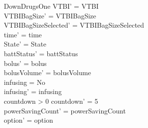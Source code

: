 \begin{schema}{DownDrugsOne}
	VTBI' = VTBI\\
	VTBIBagSize' = VTBIBagSize\\ VTBIBagSizeSelected' = VTBIBagSizeSelected\\
	time' = time\\ State' = State\\
	battStatus' = battStatus\\
	bolus' = bolus\\
	bolusVolume' = bolusVolume\\
	\pagebreak
	infusing = No\\
	infusing' = infusing\\
	countdown > 0 \land countdown' = 5\\
	powerSavingCount' = powerSavingCount\\ option' = option\\
\end{schema}

